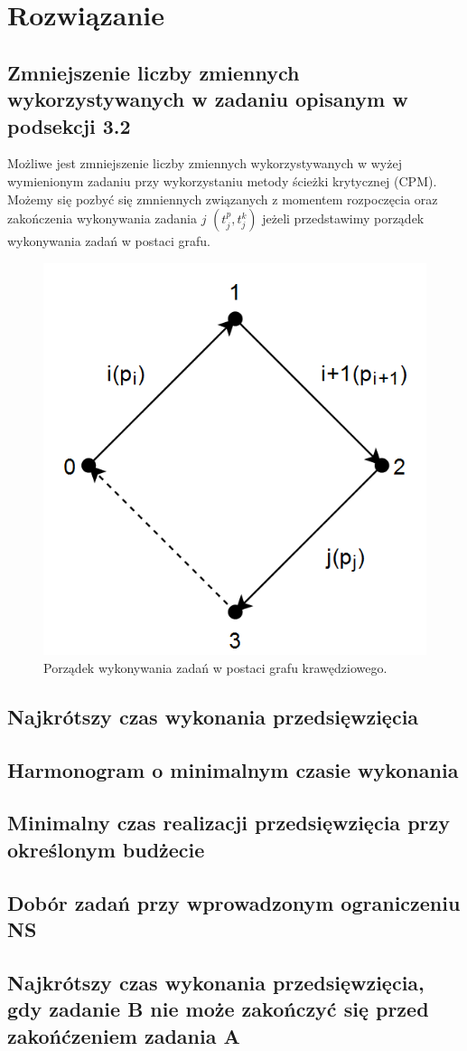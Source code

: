 \documentclass[
    12pt, %
]{../fphw}
\begin{document}
\section{Rozwiązanie}
\subsection{Zmniejszenie liczby zmiennych wykorzystywanych w zadaniu opisanym w podsekcji 3.2}
Możliwe jest zmniejszenie liczby zmiennych wykorzystywanych w wyżej wymienionym
zadaniu przy wykorzystaniu metody ścieżki krytycznej (CPM).
Możemy się pozbyć się zmniennych związanych z momentem rozpoczęcia oraz zakończenia
wykonywania zadania \(j\) \((t^p_j, t^k_j)\) jeżeli przedstawimy porządek wykonywania zadań w postaci grafu.
\begin{figure}[H]
    \centering
    \includegraphics[width=0.7\linewidth]{./img/graf.PNG}
    \caption{Porządek wykonywania zadań w postaci grafu krawędziowego.}
    \label{fig:graf}
\end{figure}
\subsection{Najkrótszy czas wykonania przedsięwzięcia}
\subsection{Harmonogram o minimalnym czasie wykonania}
\subsection{Minimalny czas realizacji przedsięwzięcia przy określonym budżecie}
\subsection{Dobór zadań przy wprowadzonym ograniczeniu NS}
\subsection{Najkrótszy czas wykonania przedsięwzięcia, gdy zadanie B nie może zakończyć się przed zakońćzeniem zadania A}
\lstlistoflistings
\listoffigures
\listoftables
\end{document}
